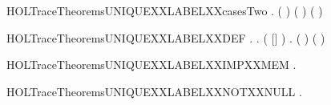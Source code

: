 \begin{SaveVerbatim}{HOLTraceTheoremsUNIQUEXXLABELXXcasesTwo}
\HOLTokenTurnstile{} \HOLSymConst{\HOLTokenForall{}}  .
        ( ) ( \HOLSymConst{::}) \HOLSymConst{\HOLTokenEquiv{}}
       ( \HOLSymConst{=} ) \HOLSymConst{\HOLTokenConj{}}  
\end{SaveVerbatim}
\newcommand{\HOLTraceTheoremsUNIQUEXXLABELXXcasesTwo}{\UseVerbatim{HOLTraceTheoremsUNIQUEXXLABELXXcasesTwo}}
\begin{SaveVerbatim}{HOLTraceTheoremsUNIQUEXXLABELXXDEF}
\HOLTokenTurnstile{} \HOLSymConst{\HOLTokenForall{}} .
          \HOLSymConst{\HOLTokenEquiv{}}
       \HOLSymConst{\HOLTokenExists{}} .
           ( \HOLSymConst{++} [] \HOLSymConst{++}  \HOLSymConst{=} ) \HOLSymConst{\HOLTokenConj{}}
           \HOLSymConst{\HOLTokenNeg{}}\HOLSymConst{\HOLTokenExists{}}.  ( )  \HOLSymConst{\HOLTokenDisj{}}  ( ) 
\end{SaveVerbatim}
\newcommand{\HOLTraceTheoremsUNIQUEXXLABELXXDEF}{\UseVerbatim{HOLTraceTheoremsUNIQUEXXLABELXXDEF}}
\begin{SaveVerbatim}{HOLTraceTheoremsUNIQUEXXLABELXXIMPXXMEM}
\HOLTokenTurnstile{} \HOLSymConst{\HOLTokenForall{}} .    \HOLSymConst{\HOLTokenImp{}}   
\end{SaveVerbatim}
\newcommand{\HOLTraceTheoremsUNIQUEXXLABELXXIMPXXMEM}{\UseVerbatim{HOLTraceTheoremsUNIQUEXXLABELXXIMPXXMEM}}
\begin{SaveVerbatim}{HOLTraceTheoremsUNIQUEXXLABELXXNOTXXNULL}
\HOLTokenTurnstile{} \HOLSymConst{\HOLTokenForall{}} .    \HOLSymConst{\HOLTokenImp{}} \HOLSymConst{\HOLTokenNeg{}} 
\end{SaveVerbatim}
\newcommand{\HOLTraceTheoremsUNIQUEXXLABELXXNOTXXNULL}{\UseVerbatim{HOLTraceTheoremsUNIQUEXXLABELXXNOTXXNULL}}

